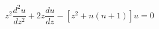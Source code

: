 \documentclass[12pt]{article}
\begin{document}
\begin{displaymath}
z^2\frac{d^2u}{dz^2} + 2z\frac{du}{dz} - [z^2 + n(n+1)]u = 0
\end{displaymath}
\end{document}
